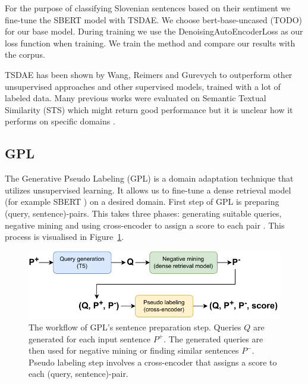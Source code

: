 \documentclass[fleqn,moreauthors,10pt]{ds_report}
\begin{document}
For the purpose of classifying Slovenian sentences based on their sentiment we fine-tune the SBERT model with TSDAE. We choose bert-base-uncased (TODO) for our base model. During training we use the DenoisingAutoEncoderLoss as our loss function when training. We train the method and compare our results with the corpus.


TSDAE has been shown by Wang, Reimers and Gurevych \cite{wang-etal-2021-tsdae-using} to outperform other unsupervised approaches and other supervised models, trained with a lot of labeled data. Many previous works were evaluated on Semantic Textual Similarity (STS) which might return good performance but it is unclear how it performs on specific domains \cite{wang-etal-2021-tsdae-using}. 


\subsection*{GPL}

The Generative Pseudo Labeling (GPL) is a domain adaptation technique that utilizes unsupervised learning. It allows us to fine-tune a dense retrieval model (for example SBERT \cite{SBERT}) on a desired domain. First step of GPL is preparing (query, sentence)-pairs. This takes three phases: generating suitable queries, negative mining and using cross-encoder to assign a score to each pair \cite{GPL}. This process is visualised in Figure~\ref{fig:GPL}.

\begin{figure}[ht]\centering
	\vspace{12 pt}
	\includegraphics[width=\linewidth]{GPL_data_preprocessing.pdf}
	\vspace{5 pt}
	\caption{The workflow of GPL's sentence preparation step. Queries $Q$ are generated for each input sentence $P^{+}$. The generated queries are then used for negative mining or finding similar sentences $P^{-}$. Pseudo labeling step involves a cross-encoder that assigns a score to each (query, sentence)-pair.}
	\label{fig:GPL}
\end{figure}
\end{document}
